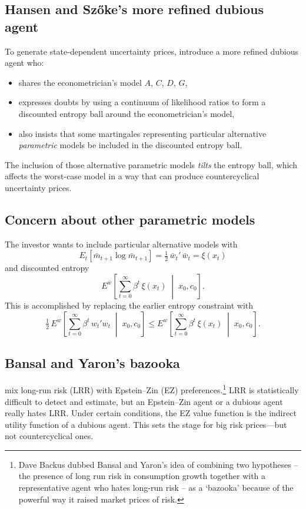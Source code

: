\documentclass[12pt]{article}
\theoremstyle{definition}
\begin{document}
\subsection{Hansen and Sz\H{o}ke's more refined dubious agent}

To generate state-dependent uncertainty prices, \citet{HSHS2020}
introduce a more refined dubious agent who:
\begin{itemize}
\item shares the econometrician's model $A$, $C$, $D$, $G$,
\item expresses doubts by using a continuum of likelihood ratios to form
      a discounted entropy ball around the econometrician's model,
\item also insists that some martingales representing particular
      alternative \emph{parametric} models be included in the
      discounted entropy ball.
\end{itemize}
The inclusion of those alternative parametric models \emph{tilts} the
entropy ball, which affects the worst-case model in a way that can
produce countercyclical uncertainty prices.

\subsection{Concern about other parametric models}

The investor wants to include particular alternative models with
\[
   E_t\!\left[\bar m_{t+1}\log\bar m_{t+1}\right]
       = \tfrac{1}{2}\,\bar w_t'\,\bar w_t = \xi(x_t)
\]
and discounted entropy
\[
   E^{\bar w}\!\left[\sum_{t=0}^{\infty} \beta^t\,\xi(x_t)
       \;\middle|\; x_0, c_0\right].
\]
This is accomplished by replacing the earlier entropy constraint with
\begin{equation}
\tfrac{1}{2}\, E^w\!\left[\sum_{t=0}^{\infty} \beta^t\, w_t' w_t
    \;\middle|\; x_0, c_0\right]
    \leq E^w\!\left[\sum_{t=0}^{\infty} \beta^t\,\xi(x_t)
    \;\middle|\; x_0, c_0\right].
\label{eq:tilted-constraint}
\end{equation}

\subsection{Bansal and Yaron's bazooka}

\citet{BY2004} mix long-run risk (LRR) with Epstein--Zin (EZ)
preferences.\footnote{Dave Backus dubbed Bansal and Yaron's idea of combining two hypotheses -- the
presence of long run risk in consumption growth together with a representative agent who hates long-run risk --
as a `bazooka' because of the powerful way it raised market prices of risk.}   LRR is statistically difficult to detect and estimate, but
an Epstein--Zin agent or a dubious agent really hates LRR.  Under
certain conditions, the EZ value function is the indirect utility
function of a dubious agent.  This sets the stage for big risk
prices---but not countercyclical ones.
\end{document}
